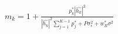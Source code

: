 \documentclass[preview]{standalone}
\begin{document}
\begin{align*}
m_k = 1 + \frac{p_k^\ast \left|\hat{h_k}\right|^2}{\left|\hat{h_k}\right|^2 \sum_{j=1}^{K-1} {p_j^\ast} + P \sigma_{\epsilon}^2 + w_B^\ast \sigma^2}
\end{align*}
\end{document}
